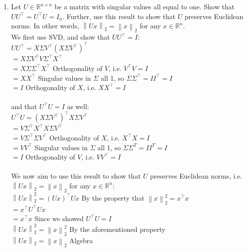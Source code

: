 \documentclass{article}
\newcommand{\field}[1]{\mathbb{#1}}
\newcommand{\1}{\mathbf{1}}
\newcommand{\R}{\field{R}} %
\newcommand{\norm}[1]{\left\|#1\right\|}
\newcommand{\twonorm}[1]{\|#1\|_2^2}
\begin{document}
{\begin{enumerate}
  Ridge Regression: \\
  $\min_w \twonorm{X w - y} + \lambda \twonorm{w}$ \\
  $= \min_w (Xw - y)^\top(Xw-y) + \lambda w^\top w$ \\
  $X\widehat{w}_{\rm R} = X(X^\top X + \lambda I)^{-1} X^\top y$ \\
  $= UDV^\top((UDV^\top)^\top UDV^\top + \lambda I)^{-1} (UDV^\top)^\top y$ \\
  $= UDV^\top(VDU^\top UDV^\top + \lambda I)^{-1} VDU^\top y$ \\
  $= UD (D^2 + \lambda I)^{-1} DU^\top y$ \\


  \item Let $U \in \R^{n\times n}$ be a matrix with singular values all equal to one. Show that $UU^\top = U^\top U = I_n$. Further, use this result to show that $U$ preserves Euclidean norms. In other words, $\norm{U x}_2 = \norm{x}_2$ for any $x\in \R^n$. \\
  
  We first use SVD, and show that $UU^\top = I$: \\ 
  $UU^\top = X \Sigma V^\top (X \Sigma V^\top)^\top$ \\
  $= X \Sigma V^\top V \Sigma^\top X^\top$ \\
  $= X \Sigma \Sigma^\top X^\top$ \hfill Orthogonality of $V$, i.e. $V^\top V = I$ \\
  $= X X^\top$ \hfill Singular values in $\Sigma$ all 1, so $\Sigma \Sigma^\top = I I^\top = I$ \\
  $= I$ \hfill Orthogonality of $X$, i.e. $X X^\top = I$ \\ \\
  and that $U^\top U = I$ as well: \\
  $U^\top U = (X \Sigma V^\top)^\top X \Sigma V^\top$ \\
  $= V \Sigma^\top X^\top X \Sigma V^\top$ \\
  $= V \Sigma^\top \Sigma V^\top$ \hfill Orthogonality of $X$, i.e. $X^\top X = I$ \\
  $= V V^\top$ \hfill Singular values in $\Sigma$ all 1, so $\Sigma \Sigma^T = I I^T = I$ \\
  $= I$ \hfill Orthogonality of $V$, i.e. $V V^\top = I$ \\ \\

  We now aim to use this result to show that $U$ preserves Euclidean norms, i.e. $\norm{U x}_2 = \norm{x}_2$ for any $x\in \R^n$: \\
  $\norm{U x}^2_2 = (Ux)^\top Ux$ \hfill By the property that $\norm{x}^2_2 = x^\top x$ \\
  $= x^\top U^\top Ux$ \\
  $= x^\top x$ \hfill Since we showed $U^\top U = I$ \\
  $\norm{U x}^2_2 = \norm{x}^2_2$ \hfill By the aforementioned property \\
  $\norm{U x}_2 = \norm{x}_2$ \hfill Algebra \\



\end{enumerate}}
\end{document}
